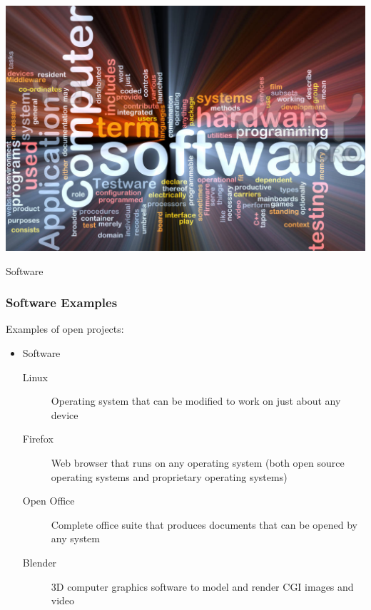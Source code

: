 \documentclass{beamer}
\begin{document}
\begin{frame}
  \begin{center} 
    \includegraphics[width=1\textwidth]{../img/software-words-3}
    \begin{Huge} Software \end{Huge} 
  \end{center}
\end{frame}

\begin{frame}
  \frametitle{Software Examples}
  Examples of open projects:

  \begin{itemize}
  \item Software
    \begin{description}
    \item[Linux] Operating system that can be modified to work on just
      about any device
    \item[Firefox] Web browser that runs on any operating system (both
      open source operating systems and proprietary operating systems)
    \item[Open Office] Complete office suite that produces documents
      that can be opened by any system
    \item[Blender] 3D computer graphics software to model and render CGI images and video
    \end{description}
    \end{itemize}
\end{frame}
\end{document}

